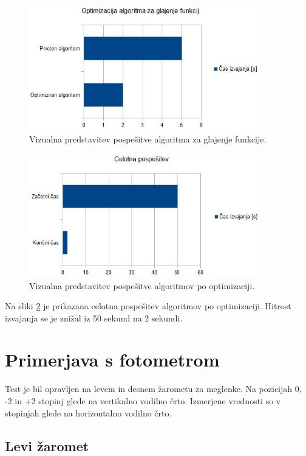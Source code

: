 \documentclass[oneside, a4paper, 12pt]{book}
\begin{document}
\begin{figure}
\begin{center}
\includegraphics[width=10cm]{slike/optimizacija_grafi/optimizacija-algoritma-za-glajenje-funkcij.jpg}
\end{center}
\caption{Vizualna predstavitev pospešitve algoritma za glajenje funkcije.}
\label{pic:opt-g}
\end{figure}

\begin{figure}
\begin{center}
\includegraphics[width=10cm]{slike/optimizacija_grafi/celotna-pospesitev.jpg}
\end{center}
\caption{Vizualna predstavitev pospešitve algoritmov po optimizaciji.}
\label{pic:opt-c}
\end{figure}

Na sliki \ref{pic:opt-c} je prikazana celotna pospešitev algoritmov po optimizaciji. Hitrost izvajanja se je znižal iz 50 sekund na 2 sekundi.

\chapter{Primerjava s fotometrom}
Test je bil opravljen na levem in desnem žarometu za meglenke. Na pozicijah 0, -2 in +2 stopinj glede na vertikalno vodilno črto. Izmerjene vrednosti so v stopinjah glede na horizontalno vodilno črto.

\section{Levi žaromet}
\end{document}
